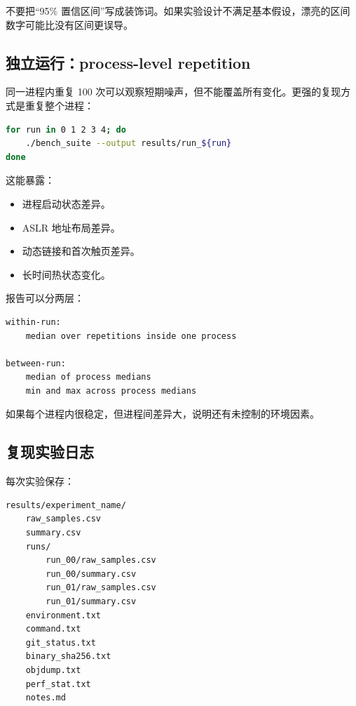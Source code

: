 \begin{warningbox}
不要把“95\% 置信区间”写成装饰词。如果实验设计不满足基本假设，漂亮的区间数字可能比没有区间更误导。
\end{warningbox}

\subsection{独立运行：process-level repetition}

同一进程内重复 100 次可以观察短期噪声，但不能覆盖所有变化。更强的复现方式是重复整个进程：

\begin{lstlisting}[language=bash]
for run in 0 1 2 3 4; do
    ./bench_suite --output results/run_${run}
done
\end{lstlisting}

这能暴露：

\begin{itemize}
  \item 进程启动状态差异。
  \item ASLR 地址布局差异。
  \item 动态链接和首次触页差异。
  \item 长时间热状态变化。
\end{itemize}

报告可以分两层：

\begin{lstlisting}
within-run:
    median over repetitions inside one process

between-run:
    median of process medians
    min and max across process medians
\end{lstlisting}

如果每个进程内很稳定，但进程间差异大，说明还有未控制的环境因素。

\subsection{复现实验日志}

每次实验保存：

\begin{lstlisting}
results/experiment_name/
    raw_samples.csv
    summary.csv
    runs/
        run_00/raw_samples.csv
        run_00/summary.csv
        run_01/raw_samples.csv
        run_01/summary.csv
    environment.txt
    command.txt
    git_status.txt
    binary_sha256.txt
    objdump.txt
    perf_stat.txt
    notes.md
\end{lstlisting}

